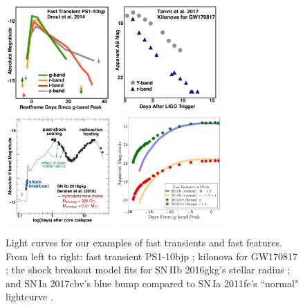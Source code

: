 \documentclass[12pt, letterpaper]{article}
\begin{document}
\begin{center}
\begin{figure}[!h]
\includegraphics[width=4cm,height=4cm]{figures/fasttrans.pdf}
\includegraphics[width=4cm,height=4cm]{figures/Tanvir_fig2_remake.pdf}
\includegraphics[width=4cm,height=4cm]{figures/2016gkg.pdf}
\includegraphics[width=4.2cm,height=4.2cm]{figures/bluebump.png}
\caption{{\scriptsize Light curves for our examples of fast transients and fast features. From left to right: fast transient PS1-10bjp \citep{Drout2014}; kilonova for GW170817 \citep{Tanvir2017}; the shock breakout model fits for SN\,IIb 2016gkg's stellar radius \citep{Bersten2018}; and SN\,Ia 2017cbv's blue bump compared to SN\,Ia 2011fe's ``normal" lightcurve \citep{Hosseinzadeh2017,Graham2015}.}}
\end{figure}
\end{center}
\end{document}
